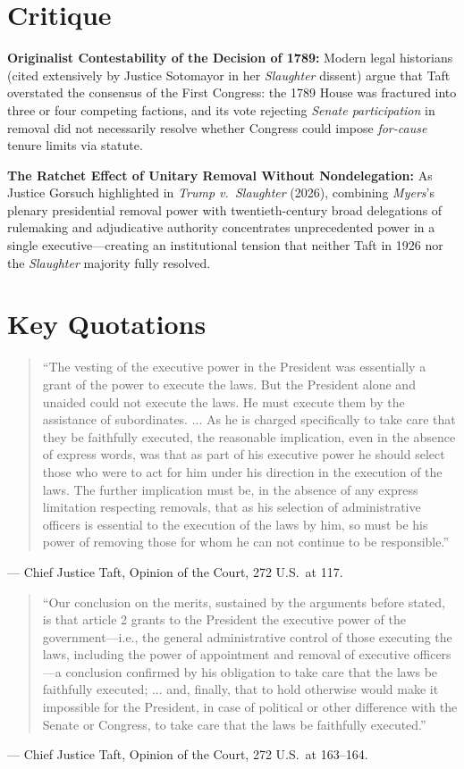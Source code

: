 \documentclass[12pt]{article}
\begin{document}
\section{Critique}
\textbf{Originalist Contestability of the Decision of 1789:} Modern legal historians (cited extensively by Justice Sotomayor in her \textit{Slaughter} dissent) argue that Taft overstated the consensus of the First Congress: the 1789 House was fractured into three or four competing factions, and its vote rejecting \emph{Senate participation} in removal did not necessarily resolve whether Congress could impose \emph{for-cause} tenure limits via statute.

\textbf{The Ratchet Effect of Unitary Removal Without Nondelegation:} As Justice Gorsuch highlighted in \textit{Trump v.\ Slaughter} (2026), combining \textit{Myers}'s plenary presidential removal power with twentieth-century broad delegations of rulemaking and adjudicative authority concentrates unprecedented power in a single executive---creating an institutional tension that neither Taft in 1926 nor the \textit{Slaughter} majority fully resolved.

\section{Key Quotations}
\begin{quote}
``The vesting of the executive power in the President was essentially a grant of the power to execute the laws. But the President alone and unaided could not execute the laws. He must execute them by the assistance of subordinates. ... As he is charged specifically to take care that they be faithfully executed, the reasonable implication, even in the absence of express words, was that as part of his executive power he should select those who were to act for him under his direction in the execution of the laws. The further implication must be, in the absence of any express limitation respecting removals, that as his selection of administrative officers is essential to the execution of the laws by him, so must be his power of removing those for whom he can not continue to be responsible.''
\end{quote}
\noindent --- Chief Justice Taft, Opinion of the Court, 272 U.S.\ at 117.

\begin{quote}
``Our conclusion on the merits, sustained by the arguments before stated, is that article 2 grants to the President the executive power of the government---i.e., the general administrative control of those executing the laws, including the power of appointment and removal of executive officers---a conclusion confirmed by his obligation to take care that the laws be faithfully executed; ... and, finally, that to hold otherwise would make it impossible for the President, in case of political or other difference with the Senate or Congress, to take care that the laws be faithfully executed.''
\end{quote}
\noindent --- Chief Justice Taft, Opinion of the Court, 272 U.S.\ at 163--164.
\end{document}
